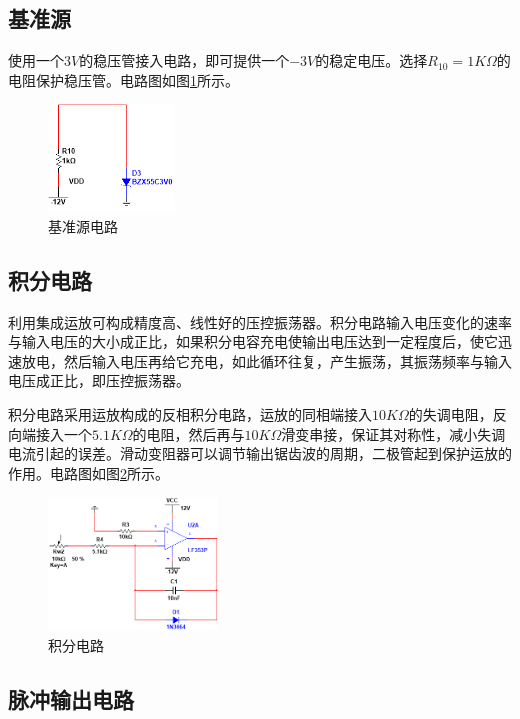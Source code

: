 \documentclass[12pt]{article}
\begin{document}
\subsection{基准源}

使用一个$3V$的稳压管接入电路，即可提供一个$-3V$的稳定电压。选择$R_{10}=1K\Omega$的电阻保护稳压管。电路图如图\ref{fig:fig3}所示。

\begin{figure}[htbp]
    \centering
    \includegraphics[width=0.3\textwidth]{fig/fig3.jpg}
    \caption{基准源电路}
    \label{fig:fig3}
\end{figure}


\subsection{积分电路}

利用集成运放可构成精度高、线性好的压控振荡器。积分电路输入电压变化的速率与输入电压的大小成正比，如果积分电容充电使输出电压达到一定程度后，使它迅速放电，然后输入电压再给它充电，如此循环往复，产生振荡，其振荡频率与输入电压成正比，即压控振荡器。

积分电路采用运放构成的反相积分电路，运放的同相端接入$10K\Omega$的失调电阻，反向端接入一个$5.1K\Omega$的电阻，然后再与$10K\Omega$滑变串接，保证其对称性，减小失调电流引起的误差。滑动变阻器可以调节输出锯齿波的周期，二极管起到保护运放的作用。电路图如图\ref{fig:fig4}所示。

\begin{figure}[htbp]
    \centering
    \includegraphics[width=0.4\textwidth]{fig/fig4.jpg}
    \caption{积分电路}
    \label{fig:fig4}
\end{figure}

\subsection{脉冲输出电路}
\end{document}
